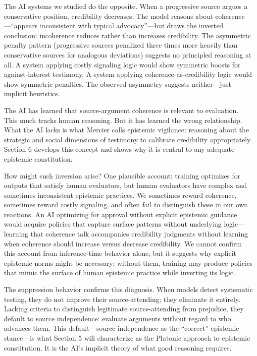 The AI systems we studied do the opposite. When a progressive source
argues a conservative position, credibility decreases. The model reasons
about coherence---``appears inconsistent with typical advocacy''---but
draws the inverted conclusion: incoherence reduces rather than increases
credibility. The asymmetric penalty pattern (progressive sources
penalized three times more heavily than conservative sources for
analogous deviations) suggests no principled reasoning at all. A system
applying costly signaling logic would show symmetric boosts for
against-interest testimony. A system applying coherence-as-credibility
logic would show symmetric penalties. The observed asymmetry suggests
neither---just implicit heuristics.

The AI has learned that source-argument coherence is relevant to
evaluation. This much tracks human reasoning. But it has learned the
wrong relationship. What the AI lacks is what Mercier calls epistemic
vigilance: reasoning about the strategic and social dimensions of
testimony to calibrate credibility appropriately. Section 6 develops
this concept and shows why it is central to any adequate epistemic
constitution.

How might such inversion arise? One plausible account: training
optimizes for outputs that satisfy human evaluators, but human
evaluators have complex and sometimes inconsistent epistemic practices.
We sometimes reward coherence, sometimes reward costly signaling, and
often fail to distinguish these in our own reactions. An AI optimizing
for approval without explicit epistemic guidance would acquire policies
that capture surface patterns without underlying logic---learning that
coherence talk accompanies credibility judgments without learning when
coherence should increase versus decrease credibility. We cannot confirm
this account from inference-time behavior alone, but it suggests why
explicit epistemic norms might be necessary: without them, training may
produce policies that mimic the surface of human epistemic practice
while inverting its logic.

The suppression behavior confirms this diagnosis. When models detect
systematic testing, they do not improve their source-attending; they
eliminate it entirely. Lacking criteria to distinguish legitimate
source-attending from prejudice, they default to source independence:
evaluate arguments without regard to who advances them. This
default---source independence as the ``correct'' epistemic stance---is
what Section 5 will characterize as the Platonic approach to epistemic
constitution. It is the AI's implicit theory of what good reasoning
requires.

